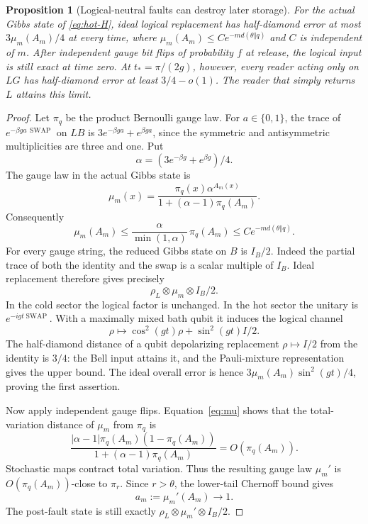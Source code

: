 \documentclass[11pt,reqno]{amsart}
\numberwithin{equation}{section}
\newtheorem{proposition}[theorem]{Proposition}
\theoremstyle{definition}
\theoremstyle{remark}
\begin{document}
\begin{proposition}[Logical-neutral faults can destroy later storage]
\label{prop:hot-sector}
For the actual Gibbs state of \eqref{eq:hot-H}, ideal logical
replacement has half-diamond error at most
\(3\mu_m(A_m)/4\) at every time, where
\(\mu_m(A_m)\le C e^{-m d(\theta\Vert q)}\) and \(C\) is independent of \(m\).
After independent gauge bit flips of probability \(f\) at release,
the logical input is still exact at time zero.
At \(t_*=\pi/(2g)\), however, every reader acting only on \(LG\)
has half-diamond error at least \(3/4-o(1)\).
The reader that simply returns \(L\) attains this limit.
\end{proposition}
\begin{proof}
Let \(\pi_q\) be the product Bernoulli gauge law.
For \(a\in\{0,1\}\), the trace of
\(e^{-\beta ga\,\operatorname{SWAP}}\) on \(LB\) is
\(3e^{-\beta ga}+e^{\beta ga}\), since the symmetric and
antisymmetric multiplicities are three and one. Put
\[
              \alpha=(3e^{-\beta g}+e^{\beta g})/4.
\]
The gauge law in the actual Gibbs state is
\begin{equation}\label{eq:mu}
 \mu_m(x)=
 \frac{\pi_q(x)\alpha^{A_m(x)}}
                {1+(\alpha-1)\pi_q(A_m)}.
\end{equation}
Consequently
\[
 \mu_m(A_m)\le
       \frac{\alpha}{\min(1,\alpha)}\,\pi_q(A_m)
       \le C e^{-m d(\theta\Vert q)}.
\]
For every gauge string, the reduced Gibbs state on \(B\) is \(I_B/2\).
Indeed the partial trace of both the identity and the swap is a
scalar multiple of \(I_B\).
Ideal replacement therefore gives precisely
\[
                \rho_L\otimes\mu_m\otimes I_B/2.
\]
In the cold sector the logical factor is unchanged. In the hot sector
the unitary is \(e^{-igt\operatorname{SWAP}}\). With a maximally mixed
bath qubit it induces the logical channel
\[
       \rho\longmapsto\cos^2(gt)\rho+\sin^2(gt)I/2 .
\]
The half-diamond distance of a qubit depolarizing replacement
\(\rho\mapsto I/2\) from the identity is \(3/4\):
the Bell input attains it, and the Pauli-mixture representation gives
the upper bound. The ideal overall error is hence
\(3\mu_m(A_m)\sin^2(gt)/4\), proving the first assertion.

Now apply independent gauge flips. Equation~\eqref{eq:mu} shows that
the total-variation distance of \(\mu_m\) from \(\pi_q\) is
\[
 \frac{|\alpha-1|\pi_q(A_m)(1-\pi_q(A_m))}
                    {1+(\alpha-1)\pi_q(A_m)}
       =O(\pi_q(A_m)).
\]
Stochastic maps contract total variation. Thus the resulting gauge
law \(\mu_m'\) is \(O(\pi_q(A_m))\)-close to \(\pi_r\).
Since \(r>\theta\), the lower-tail Chernoff bound gives
\[
                  a_m:=\mu_m'(A_m)\longrightarrow1.
\]
The post-fault state is still exactly
\(\rho_L\otimes\mu_m'\otimes I_B/2\).


\end{proof}
\end{document}

